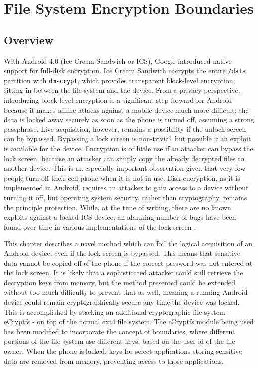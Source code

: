 \chapter{File System Encryption Boundaries}
\label{ch:ecryptfs}

\section{Overview} 
With Android 4.0 (Ice Cream Sandwich or ICS), Google introduced native support for full-disk encryption. Ice Cream Sandwich encrypts
the entire \texttt{/data} partition with \texttt{dm-crypt}, which provides transparent block-level encryption, sitting in-between
the file system and the device. From a privacy perspective, introducing block-level encryption is a significant step forward for
Android because it makes offline attacks against a mobile device much more difficult; the data is locked away securely as soon as
the phone is turned off, assuming a strong passphrase. Live acquisition, however, remains a possibility if the unlock screen can be
bypassed.  Bypassing a lock screen is non-trivial, but possible if an exploit is available for the device. Encryption is of little
use if an attacker can bypass the lock screen, because an attacker can simply copy the already decrypted files to another device.
This is an especially important observation given that very few people turn off their cell phone when it is not in use. Disk
encryption, as it is implemented in Android, requires an attacker to gain access to a device without turning it off, but operating
system security, rather than cryptography, remains the principle protection. While, at the time of writing, there are no known
exploits against a locked ICS device, an alarming number of bugs have been found over time in various implementations of the lock
screen \cite{hoog, lockscreenbypass0, lockscreenbypass1, lockscreenbypass2}.

This chapter describes a novel method which can foil the logical acquisition of an Android device, even if the lock screen is
bypassed. This means that sensitive data cannot be copied off of the phone if the correct password was not entered at the lock
screen. It is likely that a sophisticated attacker could still retrieve the decryption keys from memory, but the method presented
could be extended without too much difficulty to prevent that as well, meaning a running Android device could remain
cryptographically secure any time the device was locked. This is accomplished by stacking an additional cryptographic file system -
eCryptfs - on top of the normal ext4 file system. The eCryptfs module being used has been modified to incorporate the concept of
boundaries, where different portions of the file system use different keys, based on the user id of the file owner. When the phone
is locked, keys for select applications storing sensitive data are removed from memory, preventing access to those applications.

